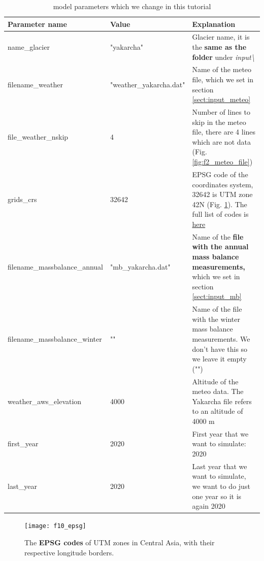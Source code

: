 \documentclass[15pt]{extarticle}
\begin{document}
\begin{table}[h!]
\caption{model parameters which we change in this tutorial}
\label{table:t1_parameters}
\centering
\begin{tabularx}{\textwidth}{|l l X|}
 \hline
 \textbf{Parameter name} & \textbf{Value} & \textbf{Explanation} \\ [0.5ex]
 \hline
 name\_glacier & "yakarcha" & Glacier name, it is the \textbf{same as the folder} under \textit{input\textbackslash} \\
 \hline
 filename\_weather & "weather\_yakarcha.dat" & Name of the meteo file, which we set in section \ref{sect:input_meteo} \\
 \hline
 file\_weather\_nskip & 4 & Number of lines to skip in the meteo file, there are 4 lines which are not data (Fig. \ref{fig:f2_meteo_file}) \\
 \hline
 grids\_crs & 32642 & EPSG code of the coordinates system, 32642 is UTM zone 42N (Fig. \ref{fig:f10_epsg}). The full list of codes is \href{https://spatialreference.org/ref/epsg/?page=80}{here} \\
 \hline
 filename\_massbalance\_annual & "mb\_yakarcha.dat" & Name of the \textbf{file with the annual mass balance measurements,} which we set in section \ref{sect:input_mb}\\
 \hline
  filename\_massbalance\_winter & "" & Name of the file with the winter mass balance measurements. We don't have this so we leave it empty ("")\\
 \hline
  weather\_aws\_elevation & 4000 & Altitude of the meteo data. The Yakarcha file refers to an altitude of 4000 m\\
 \hline
  first\_year & 2020 & First year that we want to simulate: 2020\\
 \hline
  last\_year & 2020 & Last year that we want to simulate, we want to do just one year so it is again 2020\\
 \hline
\end{tabularx}
\end{table}

\begin{figure}[hp]
    \centering
    \texttt{[image: f10\_epsg]}
    \caption{The \textbf{EPSG codes} of UTM zones in Central Asia, with their respective longitude borders.}
    \label{fig:f10_epsg}
\end{figure}

\clearpage
\end{document}
